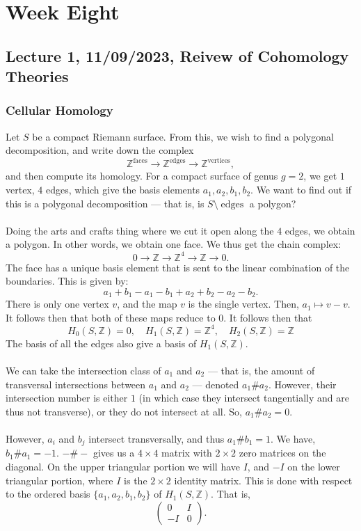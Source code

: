 \documentclass[a4paper]{report}
\theoremstyle{definition}
\theoremstyle{remark}
\theoremstyle{proposition}
\theoremstyle{conjecture}
\theoremstyle{lemma}
\theoremstyle{corollary}
\theoremstyle{exercise}
\theoremstyle{example}
\newcommand{\on}{\operatorname}
\begin{document}
\chapter{Week Eight}

\section{Lecture 1, 11/09/2023, Reivew of Cohomology Theories}

\subsection{Cellular Homology}

Let $S$ be a compact Riemann surface. From this, we wish to find a 
polygonal decomposition, and write down the complex 
$$\mathbb{Z}^{\on{faces}} \longrightarrow \mathbb{Z}^{\on{edges}} \longrightarrow \mathbb{Z}^{\on{vertices}},$$
and then compute its homology. For a compact surface of genus $g=2$, 
we get $1$ vertex, $4$ edges, which give the basis elements 
$a_1,a_2,b_1,b_2$. 
We want to find out if this is a polygonal decomposition ---
that is, is $S\setminus \on{edges}$ a polygon?\\\\
Doing the arts and crafts thing where we cut it open along the $4$
edges, we obtain a polygon. In other words, we obtain one face.
We thus get the chain complex:
$$0\longrightarrow \mathbb{Z}\longrightarrow\mathbb{Z}^4\longrightarrow\mathbb{Z}\longrightarrow 0.$$
The face has a unique basis element that is sent to 
the linear combination of the boundaries. This is given by:
$$a_1+b_1-a_1-b_1+ a_2 + b_2 - a_2 - b_2.$$
There is only one vertex $v$, and the  map 
$v$ is the single vertex. Then, 
$a_1\mapsto v-v$. It follows then that both of these maps 
reduce to $0$. It follows then that 
$$H_0(S,\mathbb{Z}) = 0, \quad H_1(S,\mathbb{Z}) = \mathbb{Z}^4,\quad H_2(S,\mathbb{Z}) = \mathbb{Z}$$
The basis of all the edges also give a basis of $H_1(S,\mathbb{Z})$.\\\\
We can take the intersection class of $a_1$ and $a_2$ --- that is, the amount of 
transversal intersections between $a_1$ and $a_2$ --- denoted 
$a_1 \# a_2$. However, their intersection number is either $1$ (in which 
case they intersect tangentially and are thus not transverse), or 
they do not intersect at all. So, $a_1\#a_2 = 0$.\\\\
However, $a_i$ and $b_j$ intersect transversally, and thus 
$a_1\# b_1 = 1$. We have, $b_1\# a_1 = -1$. $-\#-$ gives us a 
$4\times 4$ matrix with $2\times 2$ zero matrices on the diagonal.
On the upper triangular portion we will have $I$, and $-I$ on the lower
triangular portion, where $I$ is the $2\times 2$ identity matrix.
This is done with respect to the ordered basis $\lbrace a_1,a_2,b_1,b_2\rbrace$
of $H_1(S,\mathbb{Z})$. That is,
$$\begin{pmatrix}
    0&I\\
    -I&0
\end{pmatrix}.$$
\end{document}
